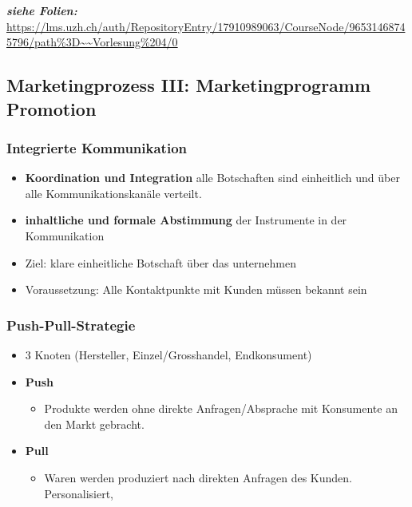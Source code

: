 \textit{\textbf{siehe Folien:}} \url{https://lms.uzh.ch/auth/RepositoryEntry/17910989063/CourseNode/96531468745796/path%3D~~Vorlesung%204/0}
\subsection{Marketingprozess III: Marketingprogramm Promotion}
\subsubsection{Integrierte Kommunikation}

\begin{itemize}
    \item \textbf{Koordination und Integration} alle Botschaften sind einheitlich und über alle Kommunikationskanäle verteilt.
    \item \textbf{inhaltliche und formale Abstimmung} der Instrumente in der Kommunikation
    \item Ziel: klare einheitliche Botschaft über das unternehmen
    \item Voraussetzung: Alle Kontaktpunkte mit Kunden müssen bekannt sein
\end{itemize}

\subsubsection{Push-Pull-Strategie}

\begin{itemize}
    \item 3 Knoten (Hersteller, Einzel/Grosshandel, Endkonsument)
    \item \textbf{Push}
    \begin{itemize}
        \item Produkte werden ohne direkte Anfragen/Absprache mit Konsumente an den Markt gebracht.
    \end{itemize}
    \item \textbf{Pull}
    \begin{itemize}
        \item Waren werden produziert nach direkten Anfragen des Kunden. Personalisiert,
    \end{itemize}
\end{itemize}

